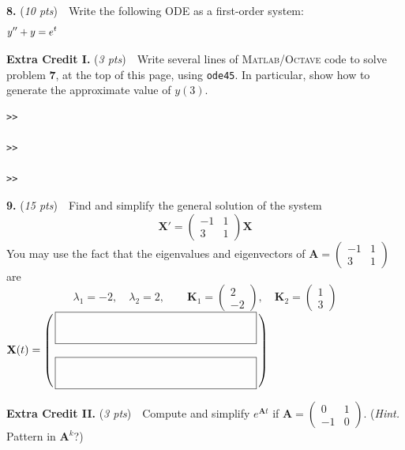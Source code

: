 \documentclass[11pt,reqno]{amsart}
\newcommand{\bA}{\mathbf{A}}
\newcommand{\bK}{\mathbf{K}}
\newcommand{\bX}{\mathbf{X}}
\newcommand{\Matlab}{\textsc{Matlab}\xspace}
\newcommand{\Octave}{\textsc{Octave}\xspace}
\newcommand{\prob}[1]{\bigskip\noindent\textbf{#1.} }
\newcommand{\pts}[1]{(\emph{#1 pts})}
\newcommand{\probpts}[2]{\prob{#1} \pts{#2} \,\,}
\begin{document}
\probpts{8}{10}  Write the following ODE as a first-order system:
    $$y''+y=e^t \hspace{120mm}$$
\vspace{0.75in}

\hfill \fbox{$\begin{matrix} & \\ \phantom{sdflkj} = & \phantom{sdflkj sdflkj asdf a} \\ & \\ \phantom{sdflkj} = & \\ & \end{matrix}$}

\probpts{Extra Credit I}{3}  Write several lines of \Matlab/\Octave code to solve problem \textbf{7}, at the top of this page, using \texttt{ode45}.  In particular, show how to generate the approximate value of $y(3)$.

\bigskip
\begin{Verbatim}
>>

>>

>>
\end{Verbatim}

\newpage
\probpts{9}{15}  Find and simplify the general solution of the system
    $$\bX' = \begin{pmatrix} -1 & 1 \\ 3 & 1 \end{pmatrix} \bX$$
You may use the fact that the eigenvalues and eigenvectors of $\bA=\begin{pmatrix} -1 & 1 \\ 3 & 1 \end{pmatrix}$ are
    $$\lambda_1 = -2, \quad \lambda_2=2, \qquad \bK_1 = \begin{pmatrix} 2 \\ -2 \end{pmatrix}, \quad \bK_2 = \begin{pmatrix} 1 \\ 3 \end{pmatrix}$$
\vfill
\hfill $\bX(t) = \begin{pmatrix}\, \fbox{\LARGE \strut \hspace{60mm} \strut}\, \\ 
\\
 \fbox{\LARGE \strut \hspace{60mm} \strut} \end{pmatrix} $

\bigskip
\probpts{Extra Credit II}{3}  Compute and simplify $e^{\bA t}$ if $\bA = \begin{pmatrix}
0 & 1 \\ -1 & 0 \end{pmatrix}$.  (\emph{Hint.}  Pattern in $\bA^k$?)
\vspace{2.0in}
\end{document}
